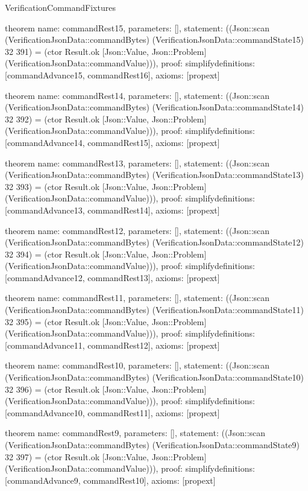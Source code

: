 \begin{lexlean}{VerificationCommandFixtures}
\begin{semanticmodule}
theorem{
  name: commandRest15,
  parameters: [],
  statement: ((Json::scan (VerificationJsonData::commandBytes) (VerificationJsonData::commandState15) 32 391) = (ctor Result.ok [Json::Value, Json::Problem] (VerificationJsonData::commandValue))),
  proof: simplify{definitions: [commandAdvance15, commandRest16]},
  axioms: [propext]
}

theorem{
  name: commandRest14,
  parameters: [],
  statement: ((Json::scan (VerificationJsonData::commandBytes) (VerificationJsonData::commandState14) 32 392) = (ctor Result.ok [Json::Value, Json::Problem] (VerificationJsonData::commandValue))),
  proof: simplify{definitions: [commandAdvance14, commandRest15]},
  axioms: [propext]
}

theorem{
  name: commandRest13,
  parameters: [],
  statement: ((Json::scan (VerificationJsonData::commandBytes) (VerificationJsonData::commandState13) 32 393) = (ctor Result.ok [Json::Value, Json::Problem] (VerificationJsonData::commandValue))),
  proof: simplify{definitions: [commandAdvance13, commandRest14]},
  axioms: [propext]
}

theorem{
  name: commandRest12,
  parameters: [],
  statement: ((Json::scan (VerificationJsonData::commandBytes) (VerificationJsonData::commandState12) 32 394) = (ctor Result.ok [Json::Value, Json::Problem] (VerificationJsonData::commandValue))),
  proof: simplify{definitions: [commandAdvance12, commandRest13]},
  axioms: [propext]
}

theorem{
  name: commandRest11,
  parameters: [],
  statement: ((Json::scan (VerificationJsonData::commandBytes) (VerificationJsonData::commandState11) 32 395) = (ctor Result.ok [Json::Value, Json::Problem] (VerificationJsonData::commandValue))),
  proof: simplify{definitions: [commandAdvance11, commandRest12]},
  axioms: [propext]
}

theorem{
  name: commandRest10,
  parameters: [],
  statement: ((Json::scan (VerificationJsonData::commandBytes) (VerificationJsonData::commandState10) 32 396) = (ctor Result.ok [Json::Value, Json::Problem] (VerificationJsonData::commandValue))),
  proof: simplify{definitions: [commandAdvance10, commandRest11]},
  axioms: [propext]
}

theorem{
  name: commandRest9,
  parameters: [],
  statement: ((Json::scan (VerificationJsonData::commandBytes) (VerificationJsonData::commandState9) 32 397) = (ctor Result.ok [Json::Value, Json::Problem] (VerificationJsonData::commandValue))),
  proof: simplify{definitions: [commandAdvance9, commandRest10]},
  axioms: [propext]
}


\end{semanticmodule}
\end{lexlean}

